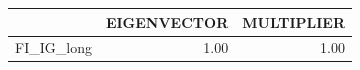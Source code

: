 \begin{tabular}{rrr}
  \hline
 & EIGENVECTOR & MULTIPLIER \\ 
  \hline
FI\_IG\_long & 1.00 & 1.00 \\ 
   \hline
\end{tabular}
